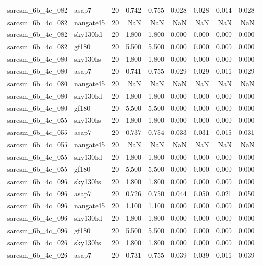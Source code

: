 \begin{tabular}{llrrrrrrr}
sarcsm\_6b\_4c\_082 & asap7 & 20 & 0.742 & 0.755 & 0.028 & 0.028 & 0.014 & 0.028 \\
sarcsm\_6b\_4c\_082 & nangate45 & 20 & NaN & NaN & NaN & NaN & NaN & NaN \\
sarcsm\_6b\_4c\_082 & sky130hd & 20 & 1.800 & 1.800 & 0.000 & 0.000 & 0.000 & 0.000 \\
sarcsm\_6b\_4c\_082 & gf180 & 20 & 5.500 & 5.500 & 0.000 & 0.000 & 0.000 & 0.000 \\
sarcsm\_6b\_4c\_080 & sky130hs & 20 & 1.800 & 1.800 & 0.000 & 0.000 & 0.000 & 0.000 \\
sarcsm\_6b\_4c\_080 & asap7 & 20 & 0.741 & 0.755 & 0.029 & 0.029 & 0.016 & 0.029 \\
sarcsm\_6b\_4c\_080 & nangate45 & 20 & NaN & NaN & NaN & NaN & NaN & NaN \\
sarcsm\_6b\_4c\_080 & sky130hd & 20 & 1.800 & 1.800 & 0.000 & 0.000 & 0.000 & 0.000 \\
sarcsm\_6b\_4c\_080 & gf180 & 20 & 5.500 & 5.500 & 0.000 & 0.000 & 0.000 & 0.000 \\
sarcsm\_6b\_4c\_055 & sky130hs & 20 & 1.800 & 1.800 & 0.000 & 0.000 & 0.000 & 0.000 \\
sarcsm\_6b\_4c\_055 & asap7 & 20 & 0.737 & 0.754 & 0.033 & 0.031 & 0.015 & 0.031 \\
sarcsm\_6b\_4c\_055 & nangate45 & 20 & NaN & NaN & NaN & NaN & NaN & NaN \\
sarcsm\_6b\_4c\_055 & sky130hd & 20 & 1.800 & 1.800 & 0.000 & 0.000 & 0.000 & 0.000 \\
sarcsm\_6b\_4c\_055 & gf180 & 20 & 5.500 & 5.500 & 0.000 & 0.000 & 0.000 & 0.000 \\
sarcsm\_6b\_4c\_096 & sky130hs & 20 & 1.800 & 1.800 & 0.000 & 0.000 & 0.000 & 0.000 \\
sarcsm\_6b\_4c\_096 & asap7 & 20 & 0.726 & 0.750 & 0.044 & 0.050 & 0.021 & 0.050 \\
sarcsm\_6b\_4c\_096 & nangate45 & 20 & 1.100 & 1.100 & 0.000 & 0.000 & 0.000 & 0.000 \\
sarcsm\_6b\_4c\_096 & sky130hd & 20 & 1.800 & 1.800 & 0.000 & 0.000 & 0.000 & 0.000 \\
sarcsm\_6b\_4c\_096 & gf180 & 20 & 5.500 & 5.500 & 0.000 & 0.000 & 0.000 & 0.000 \\
sarcsm\_6b\_4c\_026 & sky130hs & 20 & 1.800 & 1.800 & 0.000 & 0.000 & 0.000 & 0.000 \\
sarcsm\_6b\_4c\_026 & asap7 & 20 & 0.731 & 0.755 & 0.039 & 0.039 & 0.016 & 0.039 \\

\end{tabular}
